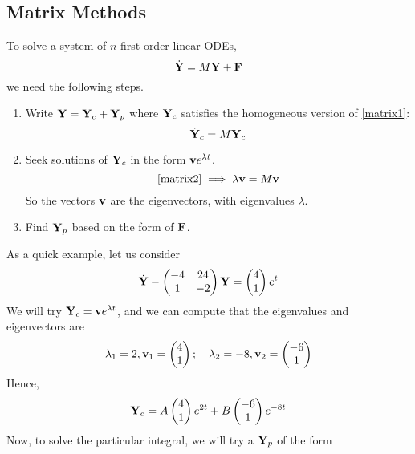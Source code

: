 \subsection{Matrix Methods}
To solve a system of $n$ first-order linear ODEs,
\begin{equation}\label{matrix1}
	\dot {\vb Y} = M\vb Y + \vb F
\end{equation}
we need the following steps.
\begin{enumerate}
	\item Write $\vb Y = \vb Y_c + \vb Y_p$ where $\vb Y_c$ satisfies the homogeneous version of \eqref{matrix1}:
	      \begin{equation}\label{matrix2}
		      \dot {\vb Y}_c = M\vb Y_c
	      \end{equation}
	\item Seek solutions of $\vb Y_c$ in the form $\vb v e^{\lambda t}$.
	      \[ \eqref{matrix2} \implies \lambda \vb v = M\vb v \]
	      So the vectors $\vb v$ are the eigenvectors, with eigenvalues $\lambda$.
	\item Find $\vb Y_p$ based on the form of $\vb F$.
\end{enumerate}
As a quick example, let us consider
\begin{equation}\label{matrixexample}
	\dot {\vb Y} - \begin{pmatrix}
		-4 & 24 \\ 1 & -2
	\end{pmatrix}\vb Y = \begin{pmatrix}
		4 \\ 1
	\end{pmatrix}e^t
\end{equation}
We will try $\vb Y_c = \vb v e^{\lambda t}$, and we can compute that the eigenvalues and eigenvectors are
\[ \lambda_1 = 2, \vb v_1 = \begin{pmatrix}
		4 \\ 1
	\end{pmatrix};\quad \lambda_2 = -8, \vb v_2 = \begin{pmatrix}
		-6 \\ 1
	\end{pmatrix} \]
Hence,
\[ \vb Y_c = A\begin{pmatrix}
		4 \\ 1
	\end{pmatrix}e^{2t} + B\begin{pmatrix}
		-6 \\ 1
	\end{pmatrix}e^{-8t} \]
Now, to solve the particular integral, we will try a $\vb Y_p$ of the form
